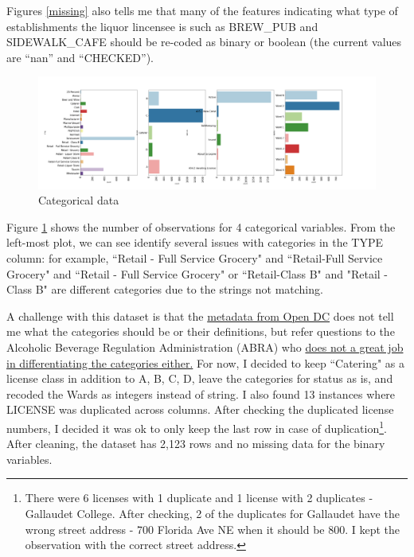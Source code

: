 \documentclass[12pt]{article}
\begin{document}
Figures \ref{missing} also tells me that many of the features indicating what type of establishments the liquor lincensee is such as BREW\_PUB and SIDEWALK\_CAFE should be re-coded as binary or boolean (the current values are ``nan'' and ``CHECKED'').


\begin{figure}[h!]
\centering
\includegraphics[width = \textwidth]{../Figures/Data_cleaning_report/cat.png}
\caption{Categorical data}
\label{cat}
\end{figure}
 
Figure \ref{cat} shows the number of observations for 4 categorical variables. From the left-most plot, we can see identify several issues with categories in the TYPE column: for example, ``Retail - Full Service Grocery" and ``Retail-Full Service Grocery" and ``Retail - Full Service Grocery" or ``Retail-Class B" and "Retail - Class B" are different categories due to the strings not matching.

A challenge with this dataset is that the \href{https://www.arcgis.com/sharing/rest/content/items/cabe9dcef0b344518c7fae1a3def7de1/info/metadata/metadata.xml?format=default&output=html}{metadata from Open DC} does not tell me what the categories should be or their definitions, but refer questions to the Alcoholic Beverage Regulation Administration (ABRA) who \href{https://abra.dc.gov/page/types-abc-licenses}{does not a great job in differentiating the categories either.} For now, I decided to keep ``Catering" as a license class in addition to A, B, C, D, leave the categories for status as is, and recoded the Wards as integers instead of string. I also found 13 instances where LICENSE was duplicated across columns. After checking the duplicated license numbers, I decided it was ok to only keep the last row in case of duplication\footnote{There were 6 licenses with 1 duplicate and 1 license with 2 duplicates - Gallaudet College. After checking, 2 of the duplicates for Gallaudet have the wrong street address - 700 Florida Ave NE when it should be 800. I kept the observation with the correct street address.}. After cleaning, the dataset has 2,123 rows and no missing data for the binary variables.
\end{document}
